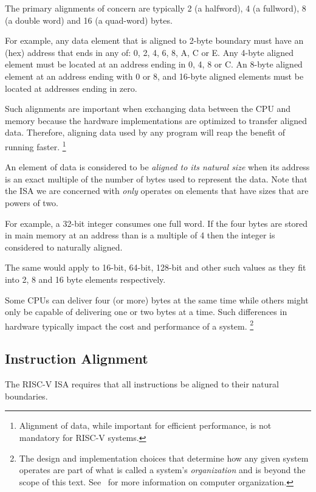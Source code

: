 The primary alignments of concern are typically 2 (a halfword), 
4 (a fullword), 8 (a double word) and 16 (a quad-word) bytes.

For example, any data element that is aligned to 2-byte boundary
must have an (hex) address that ends in any of: 0, 2, 4, 6, 8, A, 
C or E.
Any 4-byte aligned element must be located at an address ending
in 0, 4, 8 or C.  An 8-byte aligned element at an address ending
with 0 or 8, and 16-byte aligned elements must be located at
addresses ending in zero.

Such alignments are important when exchanging data between the CPU 
and memory because the hardware implementations are optimized to
transfer aligned data.  Therefore, aligning data used by any program
will reap the benefit of running faster.%
\footnote{Alignment of data, while important for efficient performance, 
is not mandatory for RISC-V systems.\cite[p.~19]{rvismv1v22:2017}}

An element of data is considered to be {\em aligned to its natural size}
when its address is an exact multiple of the number of bytes used to 
represent the data.  Note that the ISA we are concerned with {\em only}
operates on elements that have sizes that are powers of two.

For example, a 32-bit integer consumes one full word.  If the four bytes
are stored in main memory at an address than is a multiple of 4 then
the integer is considered to naturally aligned.  

The same would apply to 16-bit, 64-bit, 128-bit and other such values 
as they fit into 2, 8 and 16 byte elements respectively.

Some CPUs can deliver four (or more) bytes at the same time while others 
might only be capable of delivering one or two bytes at a time.  Such 
differences in hardware typically impact the cost and performance of a 
system.%
\footnote{The design and implementation
choices that determine how any given system operates are part of what is
called a system's {\em organization} and is beyond the scope of this text.
See~\cite{codriscv:2017} for more information on computer organization.}


\subsection{Instruction Alignment}

The RISC-V ISA requires that all instructions be aligned to their
natural boundaries.

